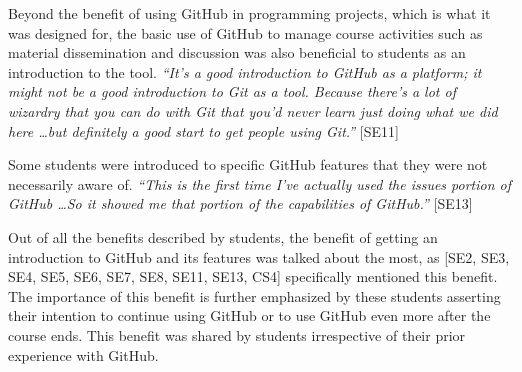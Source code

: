 Beyond the benefit of using GitHub in programming projects, which is what it was designed for, the basic use of GitHub to manage course activities such as material dissemination and discussion was also beneficial to students as an introduction to the tool. \textit{``It's a good introduction to GitHub as a platform; it might not be a good introduction to Git as a tool. Because there's a lot of wizardry that you can do with Git that you'd never learn just doing what we did here \ldots but definitely a good start to get people using Git.''} [SE11]

Some students were introduced to specific GitHub features that they were not necessarily aware of. \textit{``This is the first time I've actually used the issues portion of GitHub \ldots So it showed me that portion of the capabilities of GitHub.''} [SE13]

Out of all the benefits described by students, the benefit of getting an introduction to GitHub and its features was talked about the most, as [SE2, SE3, SE4, SE5, SE6, SE7, SE8, SE11, SE13, CS4] specifically mentioned this benefit. The importance of this benefit is further emphasized by these students asserting their intention to continue using GitHub or to use GitHub even more after the course ends. This benefit was shared by students irrespective of their prior experience with GitHub. \\




